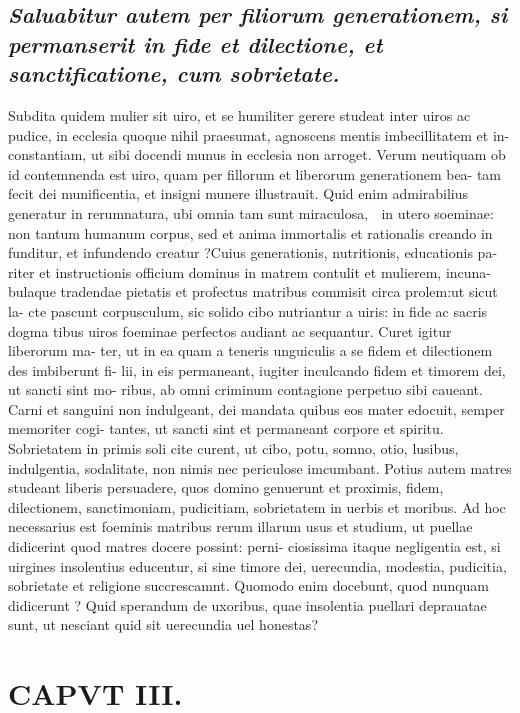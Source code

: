 \documentclass{article}
\begin{document}
\begin{pages}
\subsection*{\textit{Saluabitur autem per filiorum generationem, si permanserit in fide et dilectione, et sanctificatione, cum sobrietate. }}\pstart Subdita quidem mulier sit uiro, et se humiliter gerere studeat inter uiros ac pudice, in ecclesia quoque  nihil praesumat, agnoscens mentis imbecillitatem et in- constantiam, ut sibi docendi munus in ecclesia non arroget. Verum neutiquam ob id contemnenda est uiro, quam per fillorum et liberorum generationem bea- tam fecit dei munificentia, et insigni munere illustrauit. Quid enim admirabilius generatur in rerumnatura, ubi omnia tam sunt miraculosa,  in utero soeminae: non tantum humanum corpus, sed et anima immortalis et rationalis creando in funditur, et infundendo creatur ?Cuius generationis, nutritionis, educationis pa- riter et instructionis officium dominus in matrem contulit et mulierem, incuna- bulaque  tradendae pietatis et profectus matribus commisit circa prolem:ut sicut la- cte pascunt corpusculum, sic solido cibo nutriantur a uiris: in fide ac sacris dogma tibus uiros foeminae perfectos audiant ac sequantur. Curet igitur liberorum ma- ter, ut in ea quam a teneris unguiculis a se fidem et dilectionem des imbiberunt fi- lii, in eis permaneant, iugiter inculcando fidem et timorem dei, ut sancti sint mo- ribus, ab omni criminum contagione perpetuo sibi caueant. Carni et sanguini non indulgeant, dei mandata quibus eos mater edocuit, semper memoriter cogi- tantes, ut sancti sint et permaneant corpore et spiritu. Sobrietatem in primis soli cite curent, ut cibo, potu, somno, otio, lusibus, indulgentia, sodalitate, non nimis nec periculose imcumbant. Potius autem matres studeant liberis persuadere, quos domino genuerunt et proximis, fidem, dilectionem, sanctimoniam, pudicitiam, sobrietatem in uerbis et moribus. Ad hoc necessarius est foeminis matribus rerum illarum usus et studium, ut puellae didicerint quod matres docere possint: perni- ciosissima itaque  negligentia est, si uirgines insolentius educentur, si sine timore dei, uerecundia, modestia, pudicitia, sobrietate et religione succrescamnt. Quomodo enim docebunt, quod nunquam didicerunt ? Quid sperandum de uxoribus, quae insolentia puellari deprauatae sunt, ut nesciant quid sit uerecundia uel honestas?  \pend
\endnumbering\beginnumbering\section{CAPVT III.}
{}

\end{pages}
\end{document}
